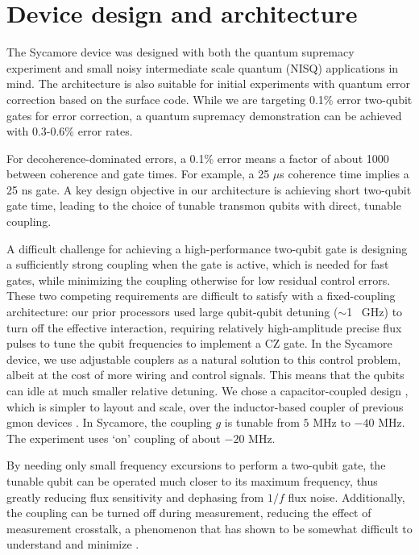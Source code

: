 \section{\label{architecture}Device design and architecture}
The Sycamore device was designed with both the quantum supremacy experiment \cite{arute2019} and small noisy intermediate scale quantum (NISQ) applications in mind. The architecture is also suitable for initial experiments with quantum error correction based on the surface code.  While we are targeting 0.1\% error two-qubit gates for error correction, a quantum supremacy demonstration can be achieved with 0.3-0.6\% error rates. 

For decoherence-dominated errors, a 0.1\% error means a factor of about 1000 between coherence and gate times.  For example, a 25 $\mu$s coherence time implies a 25 ns gate.  A key design objective in our architecture is achieving short two-qubit gate time, leading to the choice of tunable transmon qubits with direct, tunable coupling.

A difficult challenge for achieving a high-performance two-qubit gate is designing a sufficiently strong coupling when the gate is active, which is needed for fast gates, while minimizing the coupling otherwise for low residual control errors. These two competing requirements are difficult to satisfy with a fixed-coupling architecture: our prior processors \cite{barends2014nine} used large qubit-qubit detuning ($\sim$1~ GHz) to turn off the effective interaction, requiring relatively high-amplitude precise flux pulses to tune the qubit frequencies to implement a CZ gate. In the Sycamore device, we use adjustable couplers \cite{charles_thesis} as a natural solution to this control problem, albeit at the cost of more wiring and control signals. This means that the qubits can idle at much smaller relative detuning. We chose a capacitor-coupled design \cite{charles_thesis, Yan-2018-MIT}, which is simpler to layout and scale, over the inductor-based coupler of previous gmon devices \cite{chen2014coupler, neill2018blueprint}. In Sycamore, the coupling $g$ is tunable from $5$ MHz to $-40$ MHz. The experiment uses `on' coupling of about $-20$ MHz.  

By needing only small frequency excursions to perform a two-qubit gate, the tunable qubit can be operated much closer to its maximum frequency, thus greatly reducing flux sensitivity and dephasing from $1/f$ flux noise.  Additionally, the coupling can be turned off during measurement, reducing the effect of measurement crosstalk, a phenomenon that has shown to be somewhat difficult to understand and minimize \cite{khezri2015transitions}.  
	
